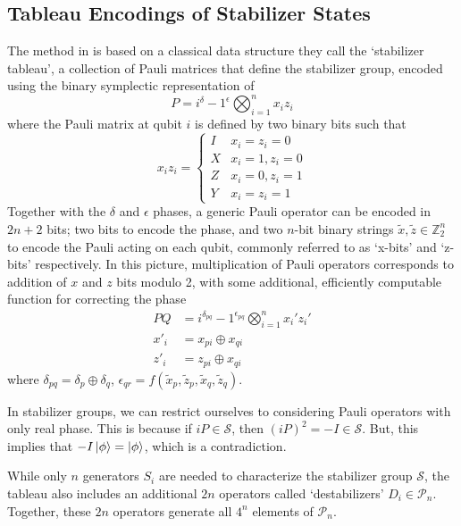 \subsection{Tableau Encodings of Stabilizer States}\label{sec:sympencoding}
The method in \cite{Aaronson2004} is based on a classical data structure they call the `stabilizer tableau', a collection of Pauli matrices that define the stabilizer group, encoded using the binary symplectic representation of \cite{Dehaene2003}
\begin{equation} P = i^{\delta}-1^{\epsilon} \bigotimes_{i=1}^{n} x_{i}z_{i}\end{equation}
where the Pauli matrix at qubit $i$ is defined by two binary bits such that
\begin{equation}
    x_{i}z_{i} = \begin{cases}
    I & x_{i}=z_{i}=0\\
    X & x_{i}=1, z_{i}=0 \\ 
    Z  &x_{i}=0, z_{i}=1 \\
    Y  &x_{i}=z_{i}=1
    \end{cases}
\end{equation}
Together with the $\delta$ and $\epsilon$ phases, a generic Pauli operator can be encoded in $2n+2$ bits; two bits to encode the phase, and two $n$-bit binary strings $\tilde{x},\tilde{z}\in\mathbb{Z}_{2}^{n}$ to encode the Pauli acting on each qubit, commonly referred to as `x-bits' and `z-bits' respectively. In this picture, multiplication of Pauli operators corresponds to addition of $x$ and $z$ bits modulo 2, with some additional, efficiently computable function for correcting the phase~\cite{Dehaene2003}
\begin{align}
    P Q &= i^{\delta_{pq}}-1^{\epsilon_{pq}}\bigotimes_{i=1}^{n}x_{i}' z_{i}' \\
    x'_{i} &= x_{pi}\oplus x_{qi} \\
    z'_{i} &= z_{pi} \oplus x_{qi}
\end{align}
where $\delta_{pq} = \delta_{p}\oplus \delta_{q}$, $\epsilon_{qr} = f(\tilde{x}_{p}, \tilde{z}_{p}, \tilde{x}_{q}, \tilde{z}_{q})$.\par
In stabilizer groups, we can restrict ourselves to considering Pauli operators with only real phase. This is because if $iP\in\mathcal{S}$, then $(iP)^{2}=-I\in\mathcal{S}$. But, this implies that $-I\ket{\phi}=\ket{\phi}$, which is a contradiction.\par
While only $n$ generators $S_{i}$ are needed to characterize the stabilizer group $\mathcal{S}$, the tableau also includes an additional $2n$ operators called `destabilizers' $D_{i}\in\mathcal{P}_{n}$. Together, these $2n$ operators generate all $4^{n}$ elements of $\mathcal{P}_{n}$.\par
